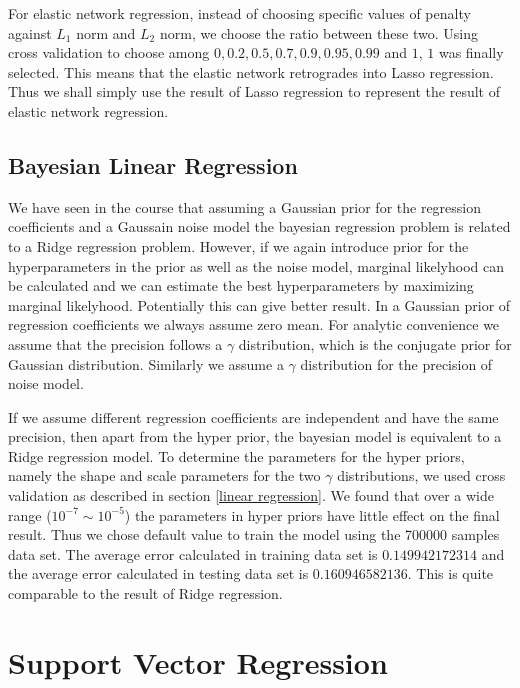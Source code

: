 \documentclass[11pt]{article}
\begin{document}
For elastic network regression, instead of choosing specific values of penalty against $L_1$ norm and $L_2$ norm, we choose the ratio between these two. Using cross validation to choose among $0, 0.2, 0.5, 0.7, 0.9, 0.95, 0.99$ and $1$, $1$ was finally selected. This means that the elastic network retrogrades into Lasso regression. Thus we shall simply use the result of Lasso regression to represent the result of elastic network regression. 

\subsection{Bayesian Linear Regression}
We have seen in the course that assuming a Gaussian prior for the regression coefficients and a Gaussain noise model the bayesian regression problem is related to a Ridge regression problem. However, if we again introduce prior for the hyperparameters in the prior as well as the noise model, marginal likelyhood can be calculated and we can estimate the best hyperparameters by maximizing marginal likelyhood. Potentially this can give better result. In a Gaussian prior of regression coefficients we always assume zero mean. For analytic convenience we assume that the precision follows a $\gamma$ distribution, which is the conjugate prior for Gaussian distribution. Similarly we assume a $\gamma$ distribution for the precision of noise model. 

If we assume different regression coefficients are independent and have the same precision, then apart from the hyper prior, the bayesian model is equivalent to a Ridge regression model. To determine the parameters for the hyper priors, namely the shape and scale parameters for the two $\gamma$ distributions, we used cross validation as described in section \ref{linear regression}. We found that over a wide range ($10^{-7} \sim 10^{-5}$) the parameters in hyper priors have little effect on the final result. Thus we chose default value to train the model using the 700000 samples data set. The average error calculated in training data set is $0.149942172314$ and the average error calculated in testing data set is $0.160946582136$. This is quite comparable to the result of Ridge regression.

\section{Support Vector Regression}
\end{document}
